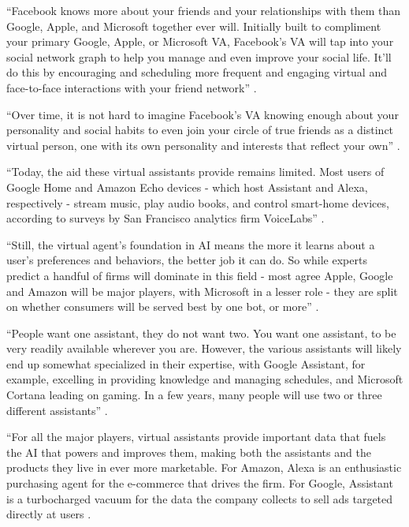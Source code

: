 ``Facebook knows more about your friends and your relationships with them than Google, Apple, and Microsoft together ever will. Initially built to compliment your primary Google, Apple, or Microsoft VA, Facebook’s VA will tap into your social network graph to help you manage and even improve your social life. It’ll do this by encouraging and scheduling more frequent and engaging virtual and face-to-face interactions with your friend network'' \cite{Tal2015internet}.

``Over time, it is not hard to imagine Facebook's VA knowing enough about your personality and social habits to even join your circle of true friends as a distinct virtual person, one with its own personality and interests that reflect your own'' \cite{Tal2015internet}.

``Today, the aid these virtual assistants provide remains limited. Most users of Google Home and Amazon Echo devices - which host Assistant and Alexa, respectively - stream music, play audio books, and control smart-home devices, according to surveys by San Francisco analytics firm VoiceLabs'' \cite{Baron2017assistants}.

``Still, the virtual agent’s foundation in AI means the more it learns about a user's preferences and behaviors, the better job it can do. So while experts predict a handful of firms will dominate in this field - most agree Apple, Google and Amazon will be major players, with Microsoft in a lesser role - they are split on whether consumers will be served best by one bot, or more'' \cite{Baron2017assistants}.

``People want one assistant, they do not want two. You want one assistant, to be very readily available wherever you are. However, the various assistants will likely end up somewhat specialized in their expertise, with Google Assistant, for example, excelling in providing knowledge and managing schedules, and Microsoft Cortana leading on gaming. In a few years, many people will use two or three different assistants'' \cite{Baron2017assistants}.

``For all the major players, virtual assistants provide important data that fuels the AI that powers and improves them, making both the assistants and the products they live in ever more marketable. For Amazon, Alexa is an enthusiastic purchasing agent for the e-commerce that drives the firm. For Google, Assistant is a turbocharged vacuum for the data the company collects to sell ads targeted directly at users \cite{Baron2017assistants}.

